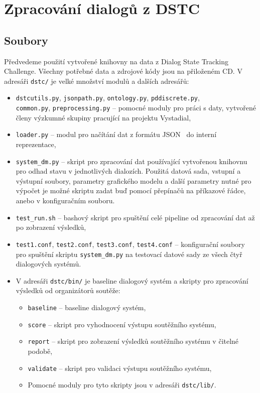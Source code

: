 \chapter{Zpracování dialogů z DSTC}
\label{ap:dstc}

\section{Soubory}
\label{sec:dstcfiles}
Předvedeme použití vytvořené knihovny na data z Dialog State Tracking Challenge.
Všechny potřebné data a zdrojové kódy jsou na přiloženém CD.
V adresáři \texttt{dstc/} je velké množství modulů a dalších adresářů:
\begin{itemize}
\item \texttt{dstcutils.py}, \texttt{jsonpath.py}, \texttt{ontology.py}, \texttt{pddiscrete.py}, \\\texttt{common.py}, \texttt{preprocessing.py} -- pomocné moduly pro práci s daty, vytvořené členy výzkumné skupiny pracující na projektu Vystadial,

\item \texttt{loader.py} -- modul pro načítání dat z formátu JSON~\cite{crockford2006application} do interní reprezentace, 

\item \texttt{system\_dm.py} -- skript pro zpracování dat používající vytvořenou knihovnu pro odhad stavu v jednotlivých dialozích.
Použitá datová sada, vstupní a výstupní soubory, parametry grafického modelu a další parametry nutné pro výpočet je možné skriptu zadat buď pomocí přepínačů na příkazové řádce, anebo v konfiguračním souboru.

\item \texttt{test\_run.sh} -- bashový skript pro spuštění celé pipeline od zpracování dat až po zobrazení výsledků,

\item \texttt{test1.conf}, \texttt{test2.conf}, \texttt{test3.conf}, \texttt{test4.conf} -- konfigurační soubory pro spuštění skriptu \texttt{system\_dm.py} na testovací datové sady ze všech čtyř dialogových systémů.

\item V adresáři \texttt{dstc/bin/} je baseline dialogový systém a skripty pro zpracování výsledků od organizátorů soutěže:
	\begin{itemize}
	\item \texttt{baseline} -- baseline dialogový systém,
	\item \texttt{score} -- skript pro vyhodnocení výstupu soutěžního systému,
	\item \texttt{report} -- skript pro zobrazení výsledků soutěžního systému v čitelné podobě,
	\item \texttt{validate} -- skript pro validaci výstupu soutěžního systému,
	\item Pomocné moduly pro tyto skripty jsou v adresáři \texttt{dstc/lib/}.
	\end{itemize}


\end{itemize}
